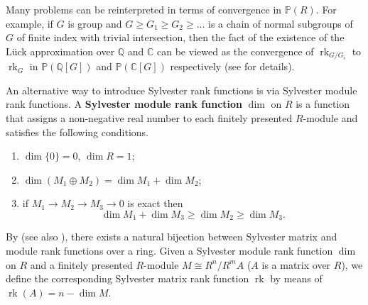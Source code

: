 \documentclass[11pt]{amsart}
\numberwithin{claimcounter}{lem}
\DeclareMathOperator{\rk}{rk}
\newcommand{\CC}{\mathbb{C}}
\newcommand{\Q}{\mathbb{Q}}
\begin{document}
Many  problems can be reinterpreted in terms of convergence in $\mathbb P(R)$. For example, if $G$ is group and $G\ge G_1\ge G_2 \ge \ldots$ is a chain of normal subgroups of $G$ of finite index with trivial intersection, then the fact of the existence of the L\"uck approximation over  $\Q$ and  $\CC$ can be viewed as    the convergence of $\rk_{G/G_i}$ to $\rk_G$ in $\mathbb P(\Q[G])$ and $\mathbb P(\CC[G])$ respectively (see \cite{Lu94, Ja19} for details).


 

An alternative way to introduce Sylvester rank functions is via Sylvester module rank functions.
 A {\bf Sylvester module rank function} $\dim$ on $R$ is a function that   assigns a non-negative real number to each finitely presented $R$-module   and satisfies the following conditions.
  \begin{enumerate}
\item [(SMod1)] $\dim \{0\} =0$, $\dim R =1$;
\item [(SMod2)]  $\dim(M_1\oplus M_2)=\dim M_1+\dim M_2$;
\item[(SMod3)] if $M_1\to M_2\to M_3\to 0$ is exact then
$$\dim M_1+\dim M_3\ge \dim M_2\ge \dim M_3.$$
\end{enumerate}
By \cite[Theorem 4]{Ma80} (see also \cite[Proposition 1.2.8]{LAthesis}), there exists  a natural bijection between Sylvester matrix and module rank functions over a ring. Given a Sylvester module rank function $\dim$ on $R$ and a finitely presented $R$-module $M\cong R^n/R^mA$ 
($A$ is a matrix over $R$), we define the corresponding Sylvester matrix  rank function $\rk$ by means of $\rk (A)=n-\dim M$. 
\end{document}
